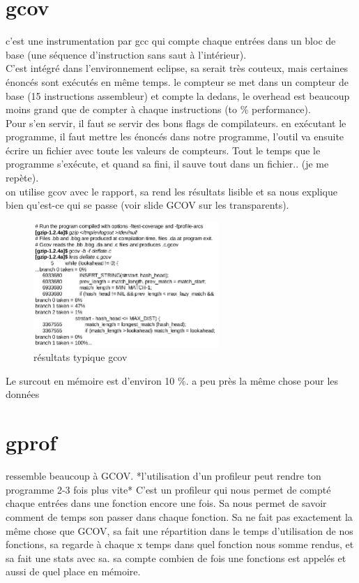 \documentclass[oneside]{book}
\begin{document}
\section{gcov}
c'est une instrumentation par gcc qui compte chaque entrées dans un bloc de base (une séquence d'instruction sans saut à l'intérieur).\\

C'est intégré dans l'environnement eclipse, sa serait très couteux, mais certaines énoncés sont exécutés en même temps. le compteur se met dans un compteur de base (15 instructions assembleur) et compte la dedans, le overhead est beaucoup moins grand que de compter à chaque instructions (to \% performance).\\

Pour s'en servir, il faut se servir des bons flags de compilateurs. en exécutant le programme, il faut mettre les énoncés dans notre programme, l'outil va ensuite écrire un fichier avec toute les valeurs de compteurs. Tout le temps que le programme s'exécute, et quand sa fini, il sauve tout dans un fichier.. (je me repète).\\

on utilise gcov avec le rapport, sa rend les résultats lisible et sa nous explique bien qu'est-ce qui se passe (voir slide GCOV sur les transparents).\\

\begin{figure}[!ht]
\centering
\includegraphics[width = 7cm]{gcov_results.png}
\caption{résultats typique gcov}
\label{fig:gcov_results}
\end{figure}

Le surcout en mémoire est d'environ 10 \%. a peu près la même chose pour les données
\section{gprof}
ressemble beaucoup à GCOV. *l'utilisation d'un profileur peut rendre ton programme 2-3 fois plus vite* C'est un profileur qui nous permet de compté chaque entrées dans une fonction encore une fois. Sa nous permet de savoir comment de temps son passer dans chaque fonction. Sa ne fait pas exactement la même chose que GCOV, sa fait une répartition dans le temps d'utilisation de nos fonctions, sa regarde à chaque x temps dans quel fonction nous somme rendus, et sa fait une stats avec sa. sa compte combien de fois une fonctions est appelés et aussi de quel place en mémoire.\\
\end{document}
